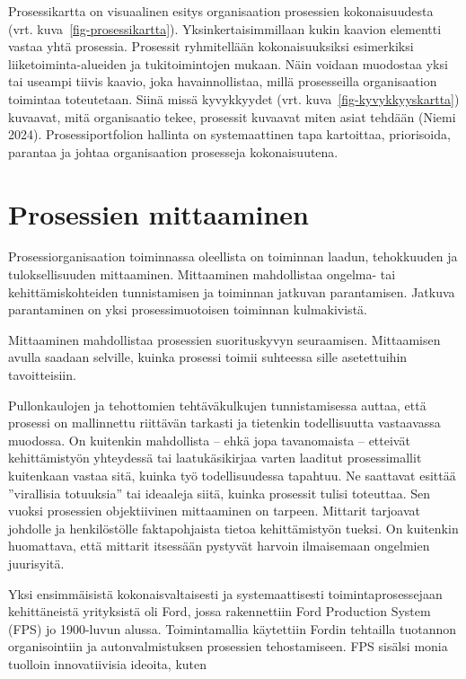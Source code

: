 \documentclass[
  finnish,
  letterpaper,
  DIV=11,
  numbers=noendperiod,
  oneside]{scrreprt}
\begin{document}
Prosessikartta on visuaalinen esitys organisaation prosessien
kokonaisuudesta (vrt. kuva~\ref{fig-prosessikartta}).
Yksinkertaisimmillaan kukin kaavion elementti vastaa yhtä prosessia.
Prosessit ryhmitellään kokonaisuuksiksi esimerkiksi
liiketoiminta-alueiden ja tukitoimintojen mukaan. Näin voidaan muodostaa
yksi tai useampi tiivis kaavio, joka havainnollistaa, millä prosesseilla
organisaation toimintaa toteutetaan. Siinä missä kyvykkyydet (vrt.
kuva~\ref{fig-kyvykkyyskartta}) kuvaavat, mitä organisaatio tekee,
prosessit kuvaavat miten asiat tehdään (Niemi 2024). Prosessiportfolion
hallinta on systemaattinen tapa kartoittaa, priorisoida, parantaa ja
johtaa organisaation prosesseja kokonaisuutena.

\section{Prosessien mittaaminen}\label{prosessien-mittaaminen}

Prosessiorganisaation toiminnassa oleellista on toiminnan laadun,
tehokkuuden ja tuloksellisuuden mittaaminen. Mittaaminen mahdollistaa
ongelma- tai kehittämiskohteiden tunnistamisen ja toiminnan jatkuvan
parantamisen. Jatkuva parantaminen on yksi prosessimuotoisen toiminnan
kulmakivistä.

Mittaaminen mahdollistaa prosessien suorituskyvyn seuraamisen.
Mittaamisen avulla saadaan selville, kuinka prosessi toimii suhteessa
sille asetettuihin tavoitteisiin.

Pullonkaulojen ja tehottomien tehtäväkulkujen tunnistamisessa auttaa,
että prosessi on mallinnettu riittävän tarkasti ja tietenkin
todellisuutta vastaavassa muodossa. On kuitenkin mahdollista -- ehkä
jopa tavanomaista -- etteivät kehittämistyön yhteydessä tai
laatukäsikirjaa varten laaditut prosessimallit kuitenkaan vastaa sitä,
kuinka työ todellisuudessa tapahtuu. Ne saattavat esittää ''virallisia
totuuksia'' tai ideaaleja siitä, kuinka prosessit tulisi toteuttaa. Sen
vuoksi prosessien objektiivinen mittaaminen on tarpeen. Mittarit
tarjoavat johdolle ja henkilöstölle faktapohjaista tietoa kehittämistyön
tueksi. On kuitenkin huomattava, että mittarit itsessään pystyvät
harvoin ilmaisemaan ongelmien juurisyitä.

Yksi ensimmäisistä kokonaisvaltaisesti ja systemaattisesti
toimintaprosessejaan kehittäneistä yrityksistä oli Ford, jossa
rakennettiin Ford Production System (FPS) jo 1900-luvun alussa.
Toimintamallia käytettiin Fordin tehtailla tuotannon organisointiin ja
autonvalmistuksen prosessien tehostamiseen. FPS sisälsi monia tuolloin
innovatiivisia ideoita, kuten
\end{document}
